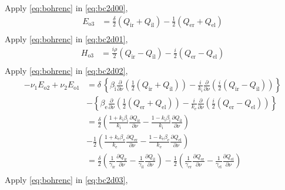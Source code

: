 Apply \eqref{eq:bohrenc} in \eqref{eq:bc2d00},
\begin{align*}
  E_{\text{o}3} &= \frac{\delta}{2}(Q_\text{ir} + Q_\text{il}) - \frac{1}{2}(Q_\text{er} + Q_\text{el}) \\
\end{align*}
Apply \eqref{eq:bohrenc} in \eqref{eq:bc2d01},
\begin{align*}
  H_{\text{o}3} &= \frac{i\rho}{2}(Q_\text{ir} - Q_\text{il}) -\frac{i}{2}(Q_\text{er} - Q_\text{el}) \\
\end{align*}
Apply \eqref{eq:bohrenc} in \eqref{eq:bc2d02},
\begin{align*}
  -\nu_1 E_{\text{o}2} + \nu_2 E_{\text{o}1} &= \delta\,\left\{\beta_\text{i}\frac{\partial}{\partial\nu}\left(\frac{1}{2}(Q_\text{ir} + Q_\text{il})\right) - \frac{i}{k_\text{i}}\frac{\partial}{\partial\nu}\left(\frac{i}{2}\left(Q_\text{ir} - Q_\text{il}\right)\right)\right\} \\
  &-\left\{\beta_\text{e}\frac{\partial}{\partial\nu}\left(\frac{1}{2}(Q_\text{er} + Q_\text{el})\right) - \frac{i}{k_\text{e}}\frac{\partial}{\partial\nu}\left(\frac{i}{2}\left(Q_\text{er} - Q_\text{el}\right)\right)\right\} \\
  &=\frac{\delta}{2}\left(\frac{1 + k_\text{i}\beta_\text{i}}{k_\text{i}}\frac{\partial Q_\text{ir}}{\partial\nu} - \frac{1 - k_\text{i}\beta_\text{i}}{k_\text{i}}\frac{\partial Q_\text{il}}{\partial\nu}\right) \\
  &-\frac{1}{2}\left(\frac{1 + k_\text{e}\beta_\text{e}}{k_\text{e}}\frac{\partial Q_\text{er}}{\partial\nu} - \frac{1 - k_\text{e}\beta_\text{e}}{k_\text{e}}\frac{\partial Q_\text{el}}{\partial\nu}\right) \\
  &=\frac{\delta}{2}\left(\frac{1}{\gamma_\text{ir}}\frac{\partial Q_\text{ir}}{\partial\nu} - \frac{1}{\gamma_\text{il}}\frac{\partial Q_\text{il}}{\partial\nu}\right) -\frac{1}{2}\left(\frac{1}{\gamma_\text{er}}\frac{\partial Q_\text{er}}{\partial\nu} - \frac{1}{\gamma_\text{el}}\frac{\partial Q_\text{el}}{\partial\nu}\right) \\
\end{align*}
Apply \eqref{eq:bohrenc} in \eqref{eq:bc2d03},
